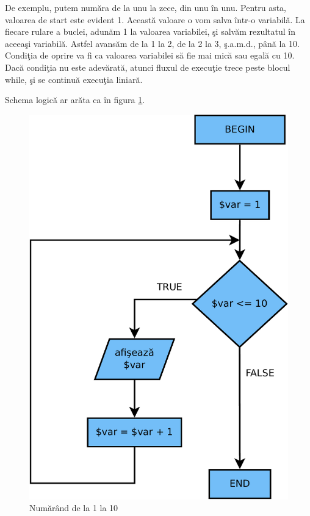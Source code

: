 
De exemplu, putem număra de la unu la zece, din unu în unu. Pentru asta,
valoarea de start este evident 1. Această valoare o vom salva într-o variabilă.
La fiecare rulare a buclei, adunăm 1 la valoarea variabilei, şi salvăm
rezultatul în aceeaşi variabilă. Astfel avansăm de la 1 la 2, de la 2 la 3,
ş.a.m.d., până la 10. Condiţia de oprire va fi ca valoarea variabilei să
fie mai mică sau egală cu 10. Dacă condiţia nu este adevărată, atunci fluxul de execuţie
{\glqq}trece peste{\grqq} blocul while, şi se continuă execuţia liniară.

Schema logică ar arăta ca în figura \ref{fig:while counting}.

\begin{figure}[h!]
  \centering
    \includegraphics[scale=.5]{cap02/count-while-crop.pdf}
  \caption{Numărând de la 1 la 10}
  \label{fig:while counting}
\end{figure}

